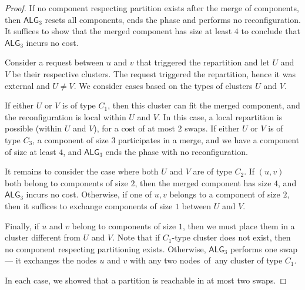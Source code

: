 \documentclass[a4paper,anonymous,USenglish]{lipics-v2019}
\newcommand{\TAlg}{{\ensuremath{\textsf{ALG}_{3}}}\xspace}
\begin{document}
\begin{proof}
	If no component respecting partition exists after the merge of components, then \TAlg resets all components, ends the phase and performs no reconfiguration.
	It suffices to show that the merged component has size at least $4$ to conclude that \TAlg incurs no cost.
	
	
	Consider a request between $u$ and $v$ that triggered the repartition and let $U$ and $V$ be their respective clusters.
	The request triggered the repartition, hence it was external and $U\neq V$.
	We consider cases based on the types of clusters $U$ and $V$.
	
	If either $U$ or $V$ is of type $C_1$, then this cluster can fit the merged component, and the reconfiguration is local within $U$ and $V$.
	In this case, a local repartition is possible (within $U$ and $V$), for a cost of at most $2$ swaps.
	If either $U$ or $V$ is of type $C_3$, a component of size $3$ participates in a merge, and we have a component of size at least $4$, and \TAlg ends the phase with no reconfiguration.
	
	
	It remains to consider the case where both $U$ and $V$ are of type $C_2$.
	If $(u,v)$ both belong to components of size $2$, then the merged component has size $4$, and \TAlg incurs no cost. 
	Otherwise, if one of $u,v$ belongs to a component of size $2$, then it suffices to exchange components of size $1$ between $U$ and $V$.

	Finally, if $u$ and $v$ belong to components of size $1$, then we must place them in a cluster different from $U$ and $V$.
	Note that if $C_1$-type cluster does not exist, then no component respecting partitioning exists.
	Otherwise, \TAlg performs one swap --- it exchanges the nodes $u$ and $v$ with any two nodes~of~any cluster of type $C_1$.

	In each case, we showed that a partition is reachable in at most two swaps.
\end{proof}
\end{document}
